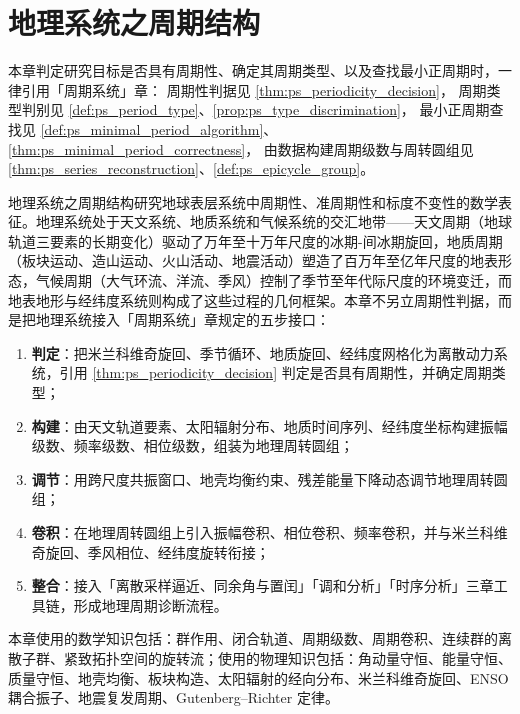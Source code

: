 \chapter{地理系统之周期结构}
\label{chap:geo-periodic}

\begin{remark}[本章目标的周期性判定（引用）]\label{rem:geo_ps_hook}
本章判定研究目标是否具有周期性、确定其周期类型、以及查找最小正周期时，一律引用「周期系统」章：
周期性判据见 \cref{thm:ps_periodicity_decision}，
周期类型判别见 \cref{def:ps_period_type}、\cref{prop:ps_type_discrimination}，
最小正周期查找见 \cref{def:ps_minimal_period_algorithm}、\cref{thm:ps_minimal_period_correctness}，
由数据构建周期级数与周转圆组见 \cref{thm:ps_series_reconstruction}、\cref{def:ps_epicycle_group}。
\end{remark}

\begin{remark}\label{rem:geo_chapter_positioning}
地理系统之周期结构研究地球表层系统中周期性、准周期性和标度不变性的数学表征。地理系统处于天文系统、地质系统和气候系统的交汇地带——天文周期（地球轨道三要素的长期变化）驱动了万年至十万年尺度的冰期-间冰期旋回，地质周期（板块运动、造山运动、火山活动、地震活动）塑造了百万年至亿年尺度的地表形态，气候周期（大气环流、洋流、季风）控制了季节至年代际尺度的环境变迁，而地表地形与经纬度系统则构成了这些过程的几何框架。本章不另立周期性判据，而是把地理系统接入「周期系统」章规定的五步接口：
\begin{enumerate}[label=(\arabic*)]
    \item \textbf{判定}：把米兰科维奇旋回、季节循环、地质旋回、经纬度网格化为离散动力系统，引用 \cref{thm:ps_periodicity_decision} 判定是否具有周期性，并确定周期类型；
    \item \textbf{构建}：由天文轨道要素、太阳辐射分布、地质时间序列、经纬度坐标构建振幅级数、频率级数、相位级数，组装为地理周转圆组；
    \item \textbf{调节}：用跨尺度共振窗口、地壳均衡约束、残差能量下降动态调节地理周转圆组；
    \item \textbf{卷积}：在地理周转圆组上引入振幅卷积、相位卷积、频率卷积，并与米兰科维奇旋回、季风相位、经纬度旋转衔接；
    \item \textbf{整合}：接入「离散采样逼近、同余角与置闰」「调和分析」「时序分析」三章工具链，形成地理周期诊断流程。
\end{enumerate}
本章使用的数学知识包括：群作用、闭合轨道、周期级数、周期卷积、连续群的离散子群、紧致拓扑空间的旋转流；使用的物理知识包括：角动量守恒、能量守恒、质量守恒、地壳均衡、板块构造、太阳辐射的经向分布、米兰科维奇旋回、ENSO 耦合振子、地震复发周期、Gutenberg–Richter 定律。
\end{remark}

